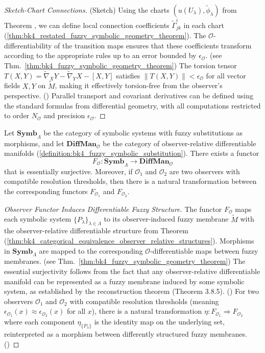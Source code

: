 \begin{proof}[Sketch-Chart Connections]
\label{proof:bk4_sketch_chart_connections}
(Sketch) Using the charts $(u(U_\lambda), \tilde{\phi}_\lambda)$ from Theorem , we can define local connection coefficients $\tilde{\Gamma}^i_{jk}$ in each chart (\ref{thm:bk4_restated_fuzzy_symbolic_geometry_theorem}). The $\mathcal{O}$-differentiability of the transition maps ensures that these coefficients transform according to the appropriate rules up to an error bounded by $\epsilon_\mathcal{O}$. (see Thm.~\ref{thm:bk4_fuzzy_symbolic_geometry_theorem})
The torsion tensor $T(X,Y) = \tilde{\nabla}_X Y - \tilde{\nabla}_Y X - [X,Y]$ satisfies $\|T(X,Y)\| < \epsilon_\mathcal{O}$ for all vector fields $X, Y$ on $\tilde{M}$, making it effectively torsion-free from the observer's perspective. ()
Parallel transport and covariant derivatives can be defined using the standard formulas from differential geometry, with all computations restricted to order $N_\mathcal{O}$ and precision $\epsilon_\mathcal{O}$.
\end{proof}
\begin{theorem} \label{thm:bk4_categorical_equivalence_observer_relative_structures}
Let $\mathbf{Symb}_\Lambda$ be the category of symbolic systems with fuzzy substitutions as morphisms, and let $\mathbf{DiffMan}_\mathcal{O}$ be the category of observer-relative differentiable manifolds (\ref{definition:bk4_fuzzy_symbolic_substitution}). There exists a functor
\[
F_\mathcal{O}: \mathbf{Symb}_\Lambda \to \mathbf{DiffMan}_\mathcal{O}
\]
that is essentially surjective. Moreover, if $\mathcal{O}_1$ and $\mathcal{O}_2$ are two observers with compatible resolution thresholds, then there is a natural transformation between the corresponding functors $F_{\mathcal{O}_1}$ and $F_{\mathcal{O}_2}$.
\end{theorem}
\begin{proof}[Observer Functor Induces Differentiable Fuzzy Structure]
\label{proof:bk4_observer_functor_induced_structure}
The functor $F_\mathcal{O}$ maps each symbolic system $\{P_\lambda\}_{\lambda \in \Lambda}$ to its observer-induced fuzzy membrane $\tilde{M}$ with the observer-relative differentiable structure from Theorem  (\ref{thm:bk4_categorical_equivalence_observer_relative_structures}). Morphisms in $\mathbf{Symb}_\Lambda$ are mapped to the corresponding $\mathcal{O}$-differentiable maps between fuzzy membranes. (see Thm.~\ref{thm:bk4_fuzzy_symbolic_geometry_theorem})
The essential surjectivity follows from the fact that any observer-relative differentiable manifold can be represented as a fuzzy membrane induced by some symbolic system, as established by the reconstruction theorem (Theorem 3.8.5). ()
For two observers $\mathcal{O}_1$ and $\mathcal{O}_2$ with compatible resolution thresholds (meaning $\epsilon_{\mathcal{O}_1}(x) \approx \epsilon_{\mathcal{O}_2}(x)$ for all $x$), there is a natural transformation $\eta: F_{\mathcal{O}_1} \Rightarrow F_{\mathcal{O}_2}$ where each component $\eta_{\{P_\lambda\}}$ is the identity map on the underlying set, reinterpreted as a morphism between differently structured fuzzy membranes. ()
\end{proof}

